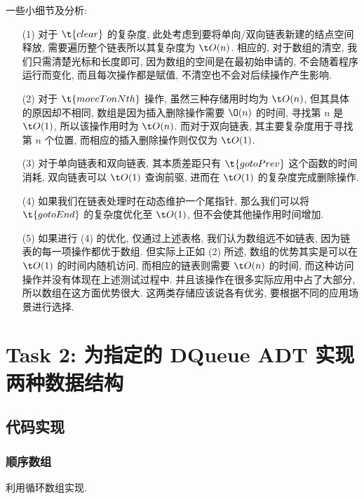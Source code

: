 一些小细节及分析:

\begin{itemize}
	\item[(1)] 对于 $\t{clear}$ 的复杂度, 此处考虑到要将单向/双向链表新建的结点空间释放, 需要遍历整个链表所以其复杂度为 $\t O(n)$. 相应的, 对于数组的清空, 我们只需清楚光标和长度即可, 因为数组的空间是在最初始申请的, 不会随着程序运行而变化, 而且每次操作都是赋值, 不清空也不会对后续操作产生影响.
	\item[(2)] 对于 $\t{moveTonNth}$ 操作, 虽然三种存储用时均为 $\t O(n)$, 但其具体的原因却不相同, 数组是因为插入删除操作需要 $\O(n)$ 的时间, 寻找第 $n$ 是 $\t O(1)$, 所以该操作用时为 $\t O(n)$. 而对于双向链表, 其主要复杂度用于寻找第 $n$ 个位置, 而相应的插入删除操作则仅仅为 $\t O(1)$.
	\item[(3)] 对于单向链表和双向链表, 其本质差距只有 $\t{gotoPrev}$ 这个函数的时间消耗, 双向链表可以 $\t O(1)$ 查询前驱, 进而在 $\t O(1)$ 的复杂度完成删除操作.
	\item[(4)] 如果我们在链表处理时在动态维护一个尾指针, 那么我们可以将 $\t{gotoEnd}$ 的复杂度优化至 $\t O(1)$, 但不会使其他操作用时间增加.
	\item[(5)] 如果进行 (4) 的优化, 仅通过上述表格, 我们认为数组远不如链表, 因为链表的每一项操作都优于数组. 但实际上正如 (2) 所述, 数组的优势其实是可以在 $\t O(1)$ 的时间内随机访问, 而相应的链表则需要 $\t O(n)$ 的时间, 而这种访问操作并没有体现在上述测试过程中. 并且该操作在很多实际应用中占了大部分, 所以数组在这方面优势很大. 这两类存储应该说各有优劣, 要根据不同的应用场景进行选择.
\end{itemize}

\section{Task 2: 为指定的 DQueue ADT 实现两种数据结构}

\subsection{代码实现}

\subsubsection{顺序数组}

利用循环数组实现.

